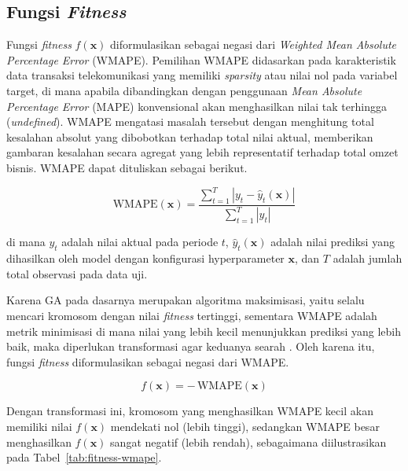     \subsection{Fungsi \textit{Fitness}}
    
    Fungsi \textit{fitness} $f(\mathbf{x})$ diformulasikan sebagai negasi
    dari \textit{Weighted Mean Absolute Percentage Error} (WMAPE). Pemilihan WMAPE didasarkan pada karakteristik data transaksi telekomunikasi yang memiliki \textit{sparsity} atau nilai nol pada variabel target, di mana apabila dibandingkan dengan penggunaan \textit{Mean Absolute Percentage Error} (MAPE) konvensional akan menghasilkan nilai tak terhingga (\textit{undefined}). WMAPE mengatasi masalah tersebut dengan menghitung total kesalahan absolut yang dibobotkan terhadap total nilai aktual, memberikan gambaran kesalahan secara agregat yang lebih representatif terhadap total omzet bisnis. WMAPE dapat dituliskan sebagai berikut.

    \begin{equation}
        \text{WMAPE}(\mathbf{x}) =
            \frac{\displaystyle\sum_{t=1}^{T} 
                  \left|y_t - \hat{y}_t(\mathbf{x})\right|}
                 {\displaystyle\sum_{t=1}^{T} \left|y_t\right|}
    \end{equation}
    
    \noindent di mana $y_t$ adalah nilai aktual pada periode $t$, $\hat{y}_t(\mathbf{x})$ adalah nilai prediksi yang dihasilkan oleh model dengan konfigurasi hyperparameter $\mathbf{x}$, dan $T$ adalah jumlah total observasi pada data uji.
    
    Karena GA pada dasarnya merupakan algoritma maksimisasi, yaitu selalu mencari kromosom dengan nilai \textit{fitness} tertinggi,
    sementara WMAPE adalah metrik minimisasi di mana nilai yang lebih kecil menunjukkan prediksi yang lebih baik, maka diperlukan transformasi agar keduanya searah \cite{Gad2021}. Oleh karena itu, fungsi
    \textit{fitness} diformulasikan sebagai negasi dari WMAPE.

    \begin{equation} \label{eq:fitness_neg}
        f(\mathbf{x}) = -\,\text{WMAPE}(\mathbf{x})
    \end{equation}

    \noindent Dengan transformasi ini, kromosom yang menghasilkan WMAPE kecil akan memiliki nilai $f(\mathbf{x})$ mendekati nol (lebih tinggi), sedangkan WMAPE besar menghasilkan $f(\mathbf{x})$ sangat negatif (lebih rendah), sebagaimana diilustrasikan pada Tabel~\ref{tab:fitness-wmape}.

